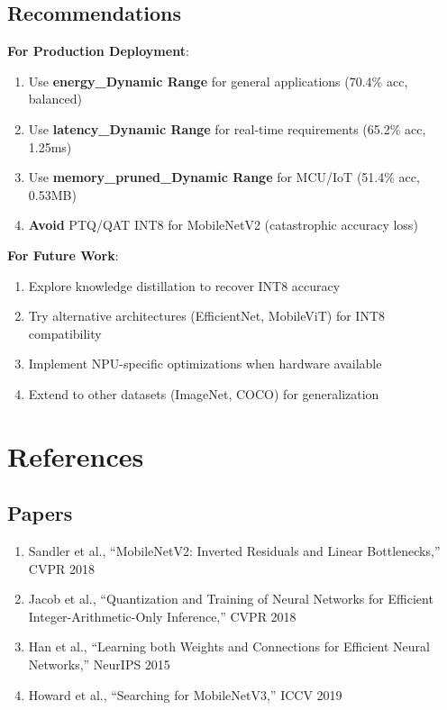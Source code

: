 \documentclass[10pt, a4paper]{article}
\begin{document}
\subsection{Recommendations}

\textbf{For Production Deployment}:
\begin{enumerate}
    \item Use \textbf{energy\_Dynamic Range} for general applications (70.4\% acc, balanced)
    \item Use \textbf{latency\_Dynamic Range} for real-time requirements (65.2\% acc, 1.25ms)
    \item Use \textbf{memory\_pruned\_Dynamic Range} for MCU/IoT (51.4\% acc, 0.53MB)
    \item \textbf{Avoid} PTQ/QAT INT8 for MobileNetV2 (catastrophic accuracy loss)
\end{enumerate}

\textbf{For Future Work}:
\begin{enumerate}
    \item Explore knowledge distillation to recover INT8 accuracy
    \item Try alternative architectures (EfficientNet, MobileViT) for INT8 compatibility
    \item Implement NPU-specific optimizations when hardware available
    \item Extend to other datasets (ImageNet, COCO) for generalization
\end{enumerate}

\section*{References}

\subsection*{Papers}
\begin{enumerate}
    \item Sandler et al., ``MobileNetV2: Inverted Residuals and Linear Bottlenecks,'' CVPR 2018
    \item Jacob et al., ``Quantization and Training of Neural Networks for Efficient Integer-Arithmetic-Only Inference,'' CVPR 2018
    \item Han et al., ``Learning both Weights and Connections for Efficient Neural Networks,'' NeurIPS 2015
    \item Howard et al., ``Searching for MobileNetV3,'' ICCV 2019
\end{enumerate}
\end{document}
